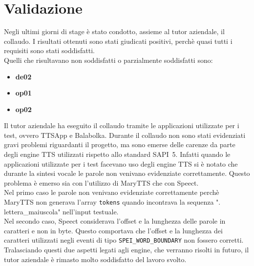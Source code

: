 \section{Validazione}
Negli ultimi giorni di stage è stato condotto, assieme al tutor aziendale, il collaudo.
I risultati ottenuti sono stati giudicati positivi, perchè quasi tutti i requisiti sono stati soddisfatti.\\
Quelli che risultavano non soddisfatti o parzialmente soddisfatti sono:
\begin{itemize}
	\item \textbf{de02}
	\item \textbf{op01}
	\item \textbf{op02}
\end{itemize}
Il tutor aziendale ha eseguito il collaudo tramite le applicazioni utilizzate per i test, ovvero TTSApp e Balabolka.
Durante il collaudo non sono stati evidenziati gravi problemi riguardanti il progetto, ma sono emerse delle carenze da parte degli engine TTS utilizzati rispetto allo standard SAPI~5.
Infatti quando le applicazioni utilizzate per i test facevano uso degli engine TTS si è notato che durante la sintesi vocale le parole non venivano evidenziate correttamente.
Questo problema è emerso sia con l'utilizzo di MaryTTS che con Speect.\\
Nel primo caso le parole non venivano evidenziate correttamente perchè MaryTTS non generava l'array \texttt{tokens} quando incontrava la sequenza ". lettera\_maiuscola" nell'input testuale.\\
Nel secondo caso, Speect considerava l'offset e la lunghezza delle parole in caratteri e non in byte. Questo comportava che l'offset e la lunghezza dei caratteri utilizzati negli eventi di tipo \texttt{SPEI\_WORD\_BOUNDARY} non fossero corretti.\\
Tralasciando questi due aspetti legati agli engine, che verranno risolti in futuro, il tutor aziendale è rimasto molto soddisfatto del lavoro svolto.

